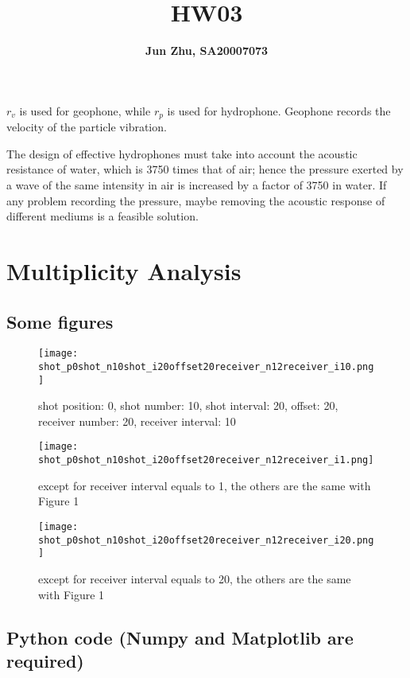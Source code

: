 \documentclass{article}
\title{\textbf{HW03}}
\author{\textbf{Jun Zhu, SA20007073}}
\begin{document}
\maketitle
\newpage{}
\section{}
$r_v$ is used for geophone, while $r_p$ is used for hydrophone.
Geophone records the velocity of the particle vibration.

The design of effective hydrophones must take into account the acoustic resistance of water, 
which is 3750 times that of air; 
hence the pressure exerted by a wave of the same intensity in air is increased by a factor of 3750 in water.
If any problem recording the pressure, maybe removing the acoustic response of different mediums is a feasible solution.
\section{Multiplicity Analysis}
\subsection{Some figures}
\begin{figure}[H]
  \centering
  \texttt{[image: shot\_p0shot\_n10shot\_i20offset20receiver\_n12receiver\_i10.png]}
  \caption{shot position: 0, shot number: 10, shot interval: 20, offset: 20, receiver number: 20, receiver interval: 10}
  \label{ref}
\end{figure}
\begin{figure}[H]
  \centering
  \texttt{[image: shot\_p0shot\_n10shot\_i20offset20receiver\_n12receiver\_i1.png]}
  \caption{except for receiver interval equals to 1, the others are the same with Figure 1}
\end{figure}
\begin{figure}[H]
  \centering
  \texttt{[image: shot\_p0shot\_n10shot\_i20offset20receiver\_n12receiver\_i20.png]}
  \caption{except for receiver interval equals to 20, the others are the same with Figure 1}
\end{figure}
\subsection{Python code (Numpy and Matplotlib are required)}
\end{document}
